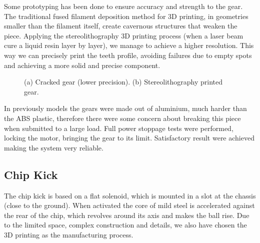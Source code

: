 Some prototyping has been done to ensure accuracy and strength to the gear. The traditional fused filament deposition method for 3D printing, in geometries smaller than the filament itself, create cavernous structures that weaken the piece. Applying the stereolithography 3D printing process (when a laser beam cure a liquid resin layer by layer), we manage to achieve a higher resolution. This way we can precisely print the teeth profile, avoiding failures due to empty spots and achieving a more solid and precise component.

\begin{figure}[!htb]
	\centering
	\caption{(a) Cracked gear (lower precision). (b) Stereolithography printed gear.}
	\label{mec3}
\end{figure}

In previously models the gears were made out of aluminium, much harder than the ABS plastic, therefore there were some concern about breaking this piece when submitted to a large load.
Full power stoppage tests were performed, locking the motor, bringing the gear to its limit. Satisfactory result were achieved making the system very reliable.

\subsection{Chip Kick}

The chip kick is based on a flat solenoid, which is mounted in a slot at the chassis (close to the ground). When activated the core of mild steel is accelerated against the rear of the chip, which revolves around its axis and makes the ball rise. Due to the limited space, complex construction and details, we also have chosen the 3D printing as the manufacturing process.


